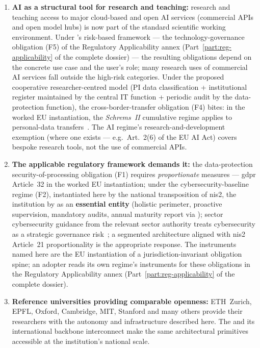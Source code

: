 \begin{enumerate}
  \item \textbf{AI as a structural tool for research and teaching:}
    research and teaching access to major cloud-based and open AI
    services (commercial APIs and open model hubs) is now part of
    the standard scientific working environment.
    Under 's risk-based framework --- the
    technology-governance obligation (F5) of the Regulatory Applicability annex
    (Part~\ref{part:reg-applicability} of the complete dossier) --- the
    resulting obligations
    depend on the concrete use case and the user's role; many research
    uses of commercial AI services fall outside the high-risk categories.
    Under the proposed cooperative researcher-centred model
    (PI data classification + institutional register maintained by
    the central IT function + periodic audit by the data-protection
    function), the cross-border-transfer obligation (F4) bites: in the worked
    EU instantiation, the \emph{Schrems~II} cumulative regime applies to
    personal-data transfers~\cite{schrems2020}.
    The AI regime's research-and-development exemption (where
    one exists --- e.g.\ Art.~2(6) of the EU AI Act) covers
    bespoke research tools, not the use of commercial APIs.
  \item \textbf{The applicable regulatory framework demands it:} the
    data-protection security-of-processing obligation (F1) requires
    \emph{proportionate} measures --- \gls{gdpr} Article~32 in the worked EU
    instantiation; under the cybersecurity-baseline regime (F2), instantiated
    here by the national transposition of \gls{nis2}, the
    institution  by 
    as an \textbf{essential entity}
    (holistic perimeter, proactive supervision, mandatory audits,
    annual maturity report via );
    sector cybersecurity guidance from the relevant sector authority
    treats cybersecurity as a strategic governance
    risk~\cite{jisc-guidance}; a segmented architecture aligned with
    \gls{nis2} Article~21 proportionality is the appropriate response. The
    instruments named here are the EU instantiation of a
    jurisdiction-invariant obligation spine; an adopter reads its own
    regime's instruments for these obligations in the Regulatory
    Applicability annex (Part~\ref{part:reg-applicability} of the
    complete dossier).
  \item \textbf{Reference universities providing comparable openness:}
    ETH~Zurich, EPFL, Oxford, Cambridge, MIT, Stanford and many others
    provide their researchers with the autonomy and infrastructure
    described here. The  and its
    international backbone interconnect
    make the same architectural primitives accessible at the
    institution's national scale.
\end{enumerate}


